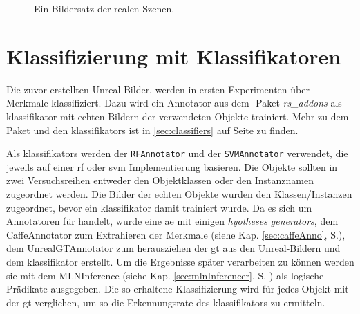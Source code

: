 \begin{figure}
\begin{subfigure}[b]{0.3\textwidth}
	\end{subfigure}
\caption[Reale Bilder einer Szene]{Ein Bildersatz der realen Szenen.}
\label{fig:exampleSceneReal}
\end{figure}


\section{Klassifizierung mit Klassifikatoren}
\label{sec:classificationExperiment}
Die zuvor erstellten Unreal-Bilder, werden in ersten Experimenten über Merkmale klassifiziert. Dazu wird ein Annotator aus dem \robosherlock-Paket \textit{rs\_addons} als \gls{klassifikator} mit echten Bildern der verwendeten Objekte trainiert. Mehr zu dem Paket und den \glspl{klassifikator} ist in \ref{sec:classifiers} auf Seite \pageref{sec:classifiers} zu finden. \par

Als \glspl{klassifikator} werden der \texttt{RFAnnotator} und der \texttt{SVMAnnotator} verwendet, die jeweils auf einer \gls{rf} oder \gls{svm} Implementierung basieren. Die Objekte sollten in zwei Versuchsreihen entweder den Objektklassen oder den Instanznamen zugeordnet werden. Die Bilder der echten Objekte wurden den Klassen/Instanzen zugeordnet, bevor ein \gls{klassifikator} damit trainiert wurde. Da es sich um Annotatoren für \robosherlock handelt, wurde eine \gls{ae} mit einigen \textit{hyotheses generators}, dem CaffeAnnotator zum Extrahieren der Merkmale (siehe Kap. \ref{sec:caffeAnno}, S.\pageref{sec:caffeAnno}), dem UnrealGTAnnotator zum herausziehen der \gls{gt} aus den Unreal-Bildern und dem \gls{klassifikator} erstellt. Um die Ergebnisse später verarbeiten zu können werden sie mit dem MLNInference (siehe Kap. \ref{sec:mlnInferencer}, S. \pageref{sec:mlnInferencer}) als logische Prädikate ausgegeben. Die so erhaltene Klassifizierung wird für jedes Objekt mit der \gls{gt} verglichen, um so die Erkennungsrate des \gls{klassifikator}s zu ermitteln.


